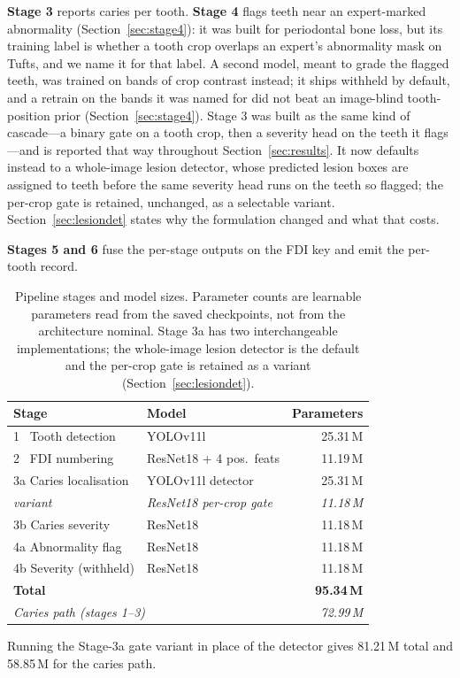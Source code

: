 \documentclass[conference]{IEEEtran}
\begin{document}
\textbf{Stage 3} reports caries per tooth. \textbf{Stage 4} flags teeth near an
expert-marked abnormality (Section~\ref{sec:stage4}): it was built for periodontal
bone loss, but its training label is whether a tooth crop overlaps an expert's
abnormality mask on Tufts, and we name it for that label. A second model, meant to
grade the flagged teeth, was trained on bands of crop contrast instead; it ships
withheld by default, and a retrain on the bands it was named for did not beat an
image-blind tooth-position prior (Section~\ref{sec:stage4}). Stage 3 was built as the same kind of
cascade---a binary gate on a tooth crop, then a severity head on the teeth it
flags---and is reported that way throughout Section~\ref{sec:results}. It now defaults instead to a whole-image
lesion detector, whose predicted lesion boxes are assigned to teeth before the same
severity head runs on the teeth so flagged; the per-crop gate is retained,
unchanged, as a selectable variant. Section~\ref{sec:lesiondet} states why the
formulation changed and what that costs.

\textbf{Stages 5 and 6} fuse the per-stage outputs on the FDI key and emit the
per-tooth record.

\begin{table}[t]
\caption{Pipeline stages and model sizes. Parameter counts are learnable
parameters read from the saved checkpoints, not from the architecture nominal.
Stage 3a has two interchangeable implementations; the whole-image lesion
detector is the default and the per-crop gate is retained as a variant
(Section~\ref{sec:lesiondet}).}
\label{tab:stages}
\centering
\small
\begin{tabular}{llr}
\toprule
Stage & Model & Parameters \\
\midrule
1 \ Tooth detection    & YOLOv11l & 25.31\,M \\
2 \ FDI numbering      & ResNet18 + 4 pos.\ feats & 11.19\,M \\
3a Caries localisation & YOLOv11l detector & 25.31\,M \\
\quad \textit{variant} & \textit{ResNet18 per-crop gate} & \textit{11.18\,M} \\
3b Caries severity     & ResNet18 & 11.18\,M \\
4a Abnormality flag    & ResNet18 & 11.18\,M \\
4b Severity (withheld) & ResNet18 & 11.18\,M \\
\midrule
\multicolumn{2}{l}{\textbf{Total}} & \textbf{95.34\,M} \\
\multicolumn{2}{l}{\textit{Caries path (stages 1--3)}} & \textit{72.99\,M} \\
\bottomrule
\end{tabular}

\vspace{2pt}
\raggedright\footnotesize
Running the Stage-3a gate variant in place of the detector gives 81.21\,M total
and 58.85\,M for the caries path.
\end{table}
\end{document}
